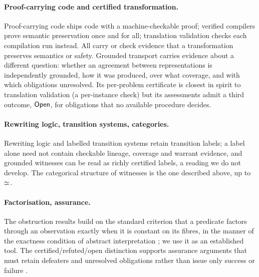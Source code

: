\paragraph{Proof-carrying code and certified transformation.}
Proof-carrying code \cite{necula1997} ships code with a machine-checkable proof; verified compilers \cite{leroy2009} prove semantic preservation once and for all; translation validation \cite{pnueli1998} checks each compilation run instead. All carry or check evidence that a transformation preserves semantics or safety. Grounded transport carries evidence about a different question: whether an agreement between representations is independently grounded, how it was produced, over what coverage, and with which obligations unresolved. Its per-problem certificate is closest in spirit to translation validation (a per-instance check) but its assessments admit a third outcome, $\mathsf{Open}$, for obligations that no available procedure decides.

\paragraph{Rewriting logic, transition systems, categories.}
Rewriting logic \cite{meseguer1992} and labelled transition systems retain transition labels; a label alone need not contain checkable lineage, coverage and warrant evidence, and grounded witnesses can be read as richly certified labels, a reading we do not develop. The categorical structure of witnesses \cite{maclane1998} is the one described above, up to $\mathrel{\simeq}$.

\paragraph{Factorisation, assurance.}
The obstruction results build on the standard criterion that a predicate factors through an observation exactly when it is constant on its fibres, in the manner of the exactness condition of abstract interpretation \cite{cousot1977}; we use it as an established tool. The certified/refuted/open distinction supports assurance arguments that must retain defeaters and unresolved obligations rather than issue only success or failure \cite{bloomfield2020}.

